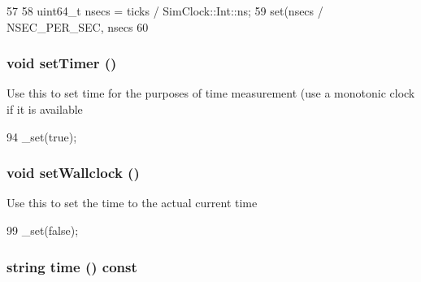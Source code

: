 \begin{DoxyCode}
57 {
58     uint64_t nsecs = ticks / SimClock::Int::ns;
59     set(nsecs / NSEC_PER_SEC, nsecs %
60 }
\end{DoxyCode}
\hypertarget{classTime_aaca92251d2a0c93c3ca57e75c8fd5e3c}{
\subsubsection[{setTimer}]{\setlength{\rightskip}{0pt plus 5cm}void setTimer ()}}
\label{classTime_aaca92251d2a0c93c3ca57e75c8fd5e3c}
Use this to set time for the purposes of time measurement (use a monotonic clock if it is available 


\begin{DoxyCode}
94 { _set(true); }
\end{DoxyCode}
\hypertarget{classTime_a051b6ee80d523f5cf1fda569ab9261c3}{
\subsubsection[{setWallclock}]{\setlength{\rightskip}{0pt plus 5cm}void setWallclock ()}}
\label{classTime_a051b6ee80d523f5cf1fda569ab9261c3}
Use this to set the time to the actual current time 


\begin{DoxyCode}
99 { _set(false); }
\end{DoxyCode}
\hypertarget{classTime_a08e4ae793506a998369618967d5cc2d2}{
\subsubsection[{time}]{\setlength{\rightskip}{0pt plus 5cm}string time () const}}
\label{classTime_a08e4ae793506a998369618967d5cc2d2}



